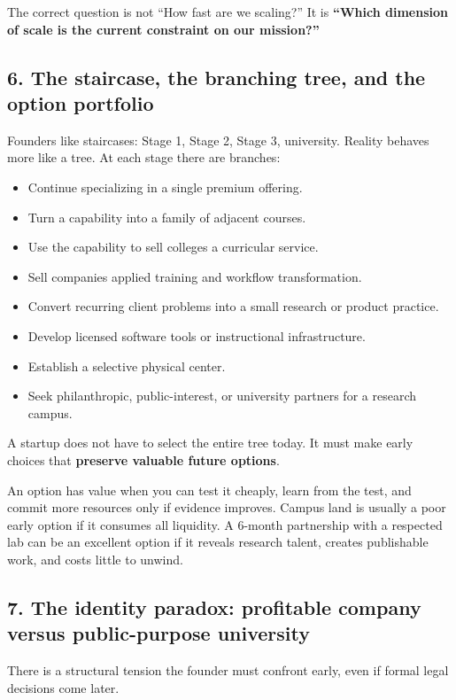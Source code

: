 The correct question is not ``How fast are we scaling?'' It is \textbf{``Which dimension of scale is the current constraint on our mission?''}

\subsection{6. The staircase, the branching tree, and the option portfolio}

Founders like staircases: Stage 1, Stage 2, Stage 3, university. Reality behaves more like a tree. At each stage there are branches:

\begin{itemize}[leftmargin=*,itemsep=1.5pt]
  \item Continue specializing in a single premium offering.
  \item Turn a capability into a family of adjacent courses.
  \item Use the capability to sell colleges a curricular service.
  \item Sell companies applied training and workflow transformation.
  \item Convert recurring client problems into a small research or product practice.
  \item Develop licensed software tools or instructional infrastructure.
  \item Establish a selective physical center.
  \item Seek philanthropic, public-interest, or university partners for a research campus.
\end{itemize}

A startup does not have to select the entire tree today. It must make early choices that \textbf{preserve valuable future options}.

An option has value when you can test it cheaply, learn from the test, and commit more resources only if evidence improves. Campus land is usually a poor early option if it consumes all liquidity. A 6-month partnership with a respected lab can be an excellent option if it reveals research talent, creates publishable work, and costs little to unwind.

\subsection{7. The identity paradox: profitable company versus public-purpose university}

There is a structural tension the founder must confront early, even if formal legal decisions come later.

